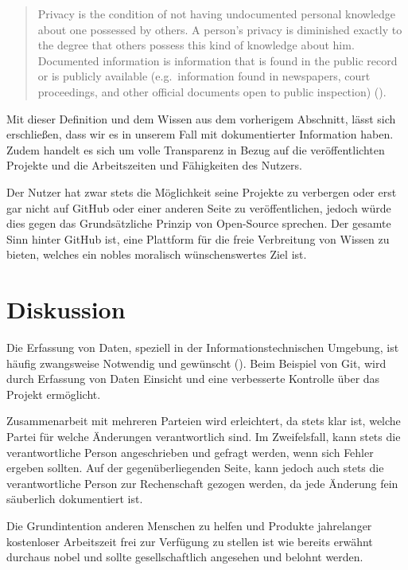 \documentclass[12pt,a4paper]{article}
\begin{document}
\begin{quote}
Privacy is the condition of not having undocumented personal knowledge about one possessed by others. A person's privacy is diminished exactly to the degree that others possess this kind of knowledge about him.
Documented information is information that is found in the public record or is publicly available (e.g.~information found in newspapers, court proceedings, and other official documents open to public inspection) (\cite[p.~203]{paper:privacymorality}).
\end{quote}

Mit dieser Definition und dem Wissen aus dem vorherigem Abschnitt, lässt sich erschließen, dass wir es in unserem Fall mit dokumentierter Information haben.
Zudem handelt es sich um volle Transparenz in Bezug auf die veröffentlichten Projekte und die Arbeitszeiten und Fähigkeiten des Nutzers.

Der Nutzer hat zwar stets die Möglichkeit seine Projekte zu verbergen oder erst gar nicht auf GitHub oder einer anderen Seite zu veröffentlichen, jedoch würde dies gegen das Grundsätzliche Prinzip von Open-Source sprechen.
Der gesamte Sinn hinter GitHub ist, eine Plattform für die freie Verbreitung von Wissen zu bieten, welches ein nobles moralisch wünschenswertes Ziel ist.

\section{Diskussion}

Die Erfassung von Daten, speziell in der Informationstechnischen Umgebung, ist häufig zwangsweise Notwendig und gewünscht (\cite[p.~6]{article:seeing-knowing}).
Beim Beispiel von Git, wird durch Erfassung von Daten Einsicht und eine verbesserte Kontrolle über das Projekt ermöglicht.

Zusammenarbeit mit mehreren Parteien wird erleichtert, da stets klar ist, welche Partei für welche Änderungen verantwortlich sind.
Im Zweifelsfall, kann stets die verantwortliche Person angeschrieben und gefragt werden, wenn sich Fehler ergeben sollten.
Auf der gegenüberliegenden Seite, kann jedoch auch stets die verantwortliche Person zur Rechenschaft gezogen werden, da jede Änderung fein säuberlich dokumentiert ist.

Die Grundintention anderen Menschen zu helfen und Produkte jahrelanger kostenloser Arbeitszeit frei zur Verfügung zu stellen ist wie bereits erwähnt durchaus nobel und sollte gesellschaftlich angesehen und belohnt werden.
\end{document}

